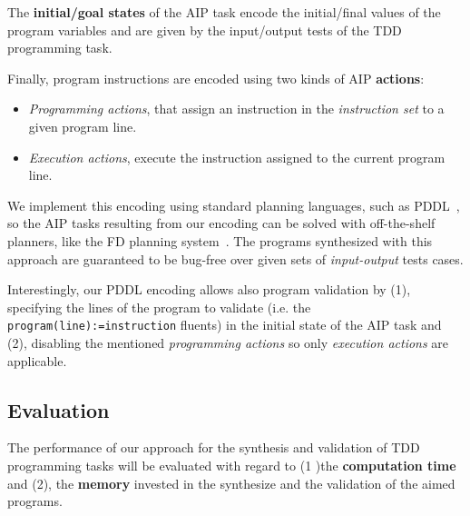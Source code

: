\documentclass[10pt,a4paper]{paper}
\begin{document}
The {\bf initial/goal states} of the AIP task encode the initial/final values of the program variables and are given by the input/output tests of the TDD programming task.

Finally, program instructions are encoded using two kinds of AIP {\bf actions}:
\begin{itemize}
\item {\it Programming actions}, that assign an instruction in the {\em instruction set} to a given program line.
\item {\it Execution actions}, execute the instruction assigned to the current program line.
\end{itemize}
We implement this encoding using standard planning languages, such as PDDL~\cite{fox2003pddl2}, so the AIP tasks resulting from our encoding can be solved with off-the-shelf planners, like the {\sc FD} planning system~\cite{helmert2006fast}. The programs synthesized with this approach are guaranteed to be bug-free over given sets of {\em input-output} tests cases.

Interestingly, our PDDL encoding allows also program validation by (1), specifying the lines of the program to validate (i.e. the {\tt program(line):=instruction} fluents) in the initial state of the AIP task and (2), disabling the mentioned {\it programming actions} so only {\it execution actions} are applicable.


\subsection{Evaluation}
\label{sec:evaluation}

The performance of our approach for the synthesis and validation of TDD programming tasks will be evaluated with regard to (1 )the {\bf computation time} and (2), the {\bf memory} invested in the synthesize and the validation of the aimed programs.
\end{document}
